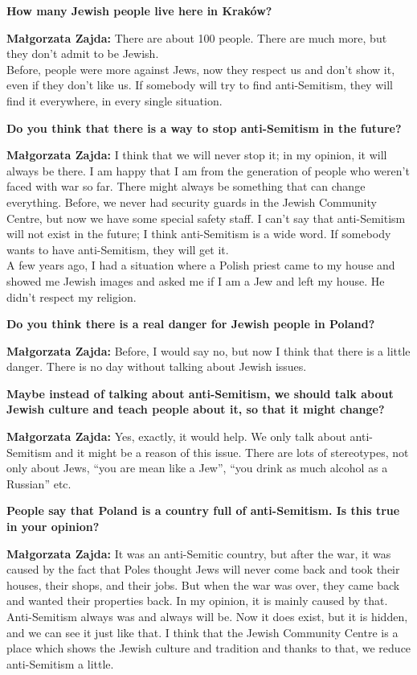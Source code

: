\textbf{How many Jewish people live here in Kraków?} 

\textbf{Małgorzata Zajda:} There are about 100 people. There are much more, but they don't admit to be Jewish.\\ 
Before, people were more against Jews, now they respect us and don't show it, even if they don't like us. If somebody will try to find anti-Semitism, they will find it everywhere, in every single situation. 

\textbf{Do you think that there is a way to stop anti-Semitism in the future?} 

\textbf{Małgorzata Zajda:} I think that we will never stop it; in my opinion, it will always be there. I am happy that I am from the generation of people who weren’t faced with war so far. There might always be something that can change everything. Before, we never had security guards in the Jewish Community Centre, but now we have some special safety staff. I can't say that anti-Semitism will not exist in the future; I think anti-Semitism is a wide word. If somebody wants to have anti-Semitism, they will get it.\\ 
A few years ago, I had a situation where a Polish priest came to my house and showed me Jewish images and asked me if I am a Jew and left my house. He didn't respect my religion.  

\textbf{Do you think there is a real danger for Jewish people in Poland?}  

\textbf{Małgorzata Zajda:} Before, I would say no, but now I think that there is a little danger. There is no day without talking about Jewish issues.  

\textbf{Maybe instead of talking about anti-Semitism, we should talk about Jewish culture and teach people about it, so that it might change?} 

\textbf{Małgorzata Zajda:} Yes, exactly, it would help. We only talk about anti-Semitism and it might be a reason of this issue.  
There are lots of stereotypes, not only about Jews, ``you are mean like a Jew'', ``you drink as much alcohol as a Russian'' etc.  

\textbf{People say that Poland is a country full of anti-Semitism. Is this true in your opinion?} 

\textbf{Małgorzata Zajda:} It was an anti-Semitic country, but after the war, it was caused by the fact that Poles thought Jews will never come back and took their houses, their shops, and their jobs. But when the war was over, they came back and wanted their properties back. In my opinion, it is mainly caused by that. Anti-Semitism always was and always will be. Now it does exist, but it is hidden, and we can see it just like that.  
I think that the Jewish Community Centre is a place which shows the Jewish culture and tradition and thanks to that, we reduce anti-Semitism a little.  

